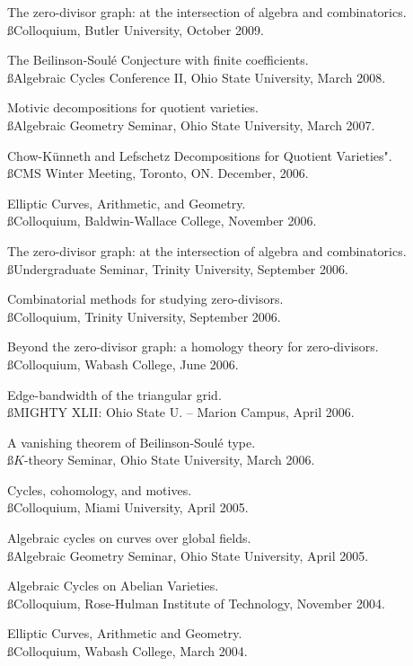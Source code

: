 \documentclass[overlapped,line,letterpaper]{res}
\begin{document}
\begin{resume}
The zero-divisor graph: at the intersection of algebra and
combinatorics. \\ {\ss Colloquium, Butler University, October 2009.}

The Beilinson-Soul\'{e} Conjecture with finite coefficients. \\ {\ss Algebraic 
Cycles Conference II, Ohio State University, March 2008.}  

Motivic decompositions for quotient varieties. \\ {\ss Algebraic
Geometry Seminar, Ohio State University, March 2007.}

Chow-K\"{u}nneth and Lefschetz Decompositions for Quotient
Varieties".  \\ {\ss CMS Winter Meeting, Toronto, ON.  December, 2006.}

Elliptic Curves, Arithmetic, and Geometry. \\ {\ss Colloquium,
Baldwin-Wallace College, November 2006.}

The zero-divisor graph: at the intersection of algebra and
combinatorics.  \\ {\ss Undergraduate Seminar, Trinity University, September
2006.}

Combinatorial methods for studying zero-divisors. \\ {\ss Colloquium,
Trinity University, September 2006.}

Beyond the zero-divisor graph: a homology theory for
zero-divisors. \\ {\ss Colloquium, Wabash College, June 2006.}

Edge-bandwidth of the triangular grid. \\ {\ss MIGHTY XLII: Ohio State U. -- Marion Campus, April 2006.}

A vanishing theorem of Beilinson-Soul\'{e} type.  \\ {\ss $K$-theory
Seminar, Ohio State University, March 2006.}

Cycles, cohomology, and motives. \\ {\ss Colloquium, Miami University, April 
2005.}

Algebraic cycles on curves over global fields.  \\ {\ss Algebraic
Geometry Seminar, Ohio State University, April 2005.}

Algebraic Cycles on Abelian Varieties.  \\ {\ss Colloquium, Rose-Hulman Institute 
of Technology, November 2004.}

Elliptic Curves, Arithmetic and Geometry.  \\ {\ss Colloquium, Wabash College, 
March 2004.}


\end{resume}
\end{document}
